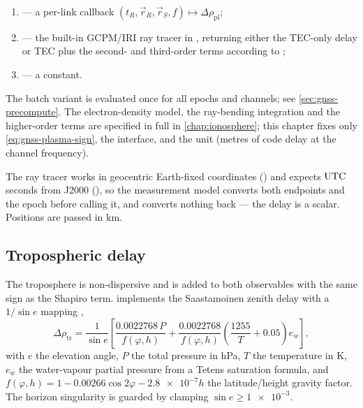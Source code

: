 \begin{enumerate}[leftmargin=1.6em,itemsep=1pt]
  \item {} --- a per-link callback
    $(t_R, \vec{r}_R, \vec{r}_S, f) \mapsto \Delta\rho_{\mathrm{pl}}$;
  \item {} --- the built-in
    GCPM/IRI ray tracer in
    , returning either the
    TEC-only delay or TEC plus the second- and third-order terms according to
    ;
  \item {} --- a constant.
\end{enumerate}

The batch variant  is evaluated
once for all epochs and channels; see \cref{sec:gnss-precompute}. The
electron-density model, the ray-bending integration and the higher-order terms
are specified in full in \cref{chap:ionosphere}; this chapter fixes only
\cref{eq:gnss-plasma-sign}, the interface, and the unit (metres of code delay
at the channel frequency).

\begin{lupntnote}
  The ray tracer works in geocentric Earth-fixed coordinates
  () and expects $\mathrm{UTC}$ seconds from J2000
  (), so the measurement model
  converts both endpoints and the epoch before calling it, and converts
  nothing back --- the delay is a scalar. Positions are passed in
  \si{\kilo\meter}.
\end{lupntnote}

\subsection{Tropospheric delay}
\label{sec:gnss-tropo}

The troposphere is non-dispersive and is added to both observables with the
same sign as the Shapiro term. \lupnt{} implements the Saastamoinen zenith
delay with a $1/\sin e$ mapping \citep{saastamoinen1972},
\begin{equation}
  \label{eq:gnss-tropo}
  \Delta\rho_{\mathrm{tr}}
  = \frac{1}{\sin e}
    \left[
      \frac{\num{0.0022768}\,P}{f(\varphi, h)}
      + \frac{\num{0.0022768}}{f(\varphi, h)}
        \left( \frac{1255}{T} + 0.05 \right) e_w
    \right],
\end{equation}
with $e$ the elevation angle, $P$ the total pressure in \si{\hecto\pascal},
$T$ the temperature in \si{\kelvin}, $e_w$ the water-vapour partial pressure
from a Tetens saturation formula, and
$f(\varphi,h) = 1 - \num{0.00266}\cos 2\varphi - \num{2.8e-7} h$ the
latitude/height gravity factor. The horizon singularity is guarded by clamping
$\sin e \ge \num{1e-3}$.

